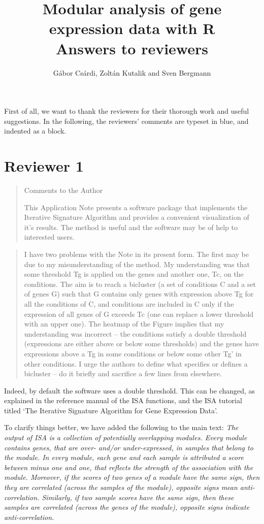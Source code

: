 \documentclass[a4paper]{article}
\title{Modular analysis of gene expression data with R\\
  Answers to reviewers}
\author{G\'abor Cs\'ardi, Zolt\'an Kutalik and Sven Bergmann}
\newenvironment{myquote}{\begin{quote}\color{blue}}{\end{quote}}
\begin{document}
\maketitle

First of all, we want to thank the reviewers for their thorough work
and useful suggestions. In the following, the reviewers' comments are
typeset in blue, and indented as a block.

\section*{Reviewer 1}

\begin{myquote}
Comments to the Author

This Application Note presents a software package that implements the
Iterative Signature Algorithm and provides a convenient visualization
of it’s results. The method is useful and the software may be of help
to interested users. 
\end{myquote}

\begin{myquote}
I have two problems with the Note in its present form.
The first may be due to my misunderstanding of the method. My
understanding was that some threshold Tg is applied on the genes and
another one, Tc, on the conditions. The aim is to reach a bicluster (a
set of conditions C and a set of genes G) such that G contains only
genes with expression above Tg for all the conditions of C, and
conditions are included in C only if the expression of all genes of G
exceeds Tc (one can replace a lower threshold with an upper one). The
heatmap of the Figure implies that my understanding was incorrect –
the conditions satisfy a double threshold (expressions are either
above or below some thresholds) and the genes have expressions above a
Tg in some conditions or below some other Tg’ in other conditions. 
I urge the authors to define what specifies or defines a bicluster –
do it briefly and sacrifice a few lines from elsewhere. 
\end{myquote}

Indeed, by default the software uses a double threshold. This can be
changed, as explained in the reference manual of the ISA functions,
and the ISA tutorial titled `The Iterative Signature Algorithm for
Gene Expression Data'.

To  clarify things better, we have added the following to the main
text:
\textsl{The output of ISA is a collection of potentially overlapping
modules. Every module contains genes, that are over- and/or
under-expressed, in samples that belong to the module.
In every module, each gene and each sample is attributed a
score between minus one and one, that reflects the strength of the
association with the module. Moreover, if the scores of two genes of a
module have the same sign, then they are correlated (across the
samples of the module), opposite signs mean
anti-correlation. Similarly, if two sample
scores have the same sign, then these samples are correlated (across
the genes of the module), opposite signs indicate anti-correlation.}
\end{document}
